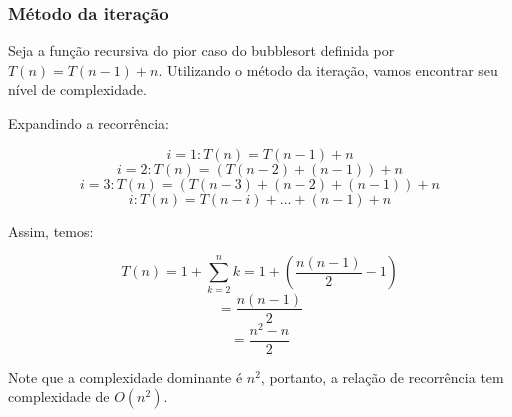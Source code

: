 \subsubsection{Método da iteração}
Seja a função recursiva do pior caso do bubblesort definida por \( T(n) = T(n-1) + n \). Utilizando o método da iteração, vamos encontrar seu nível de complexidade. 

Expandindo a recorrência:

\[
i = 1 : T(n) = T(n - 1) + n
\]
\[
i = 2 : T(n) = (T(n - 2) + (n - 1)) + n
\]
\[
i = 3 : T(n) = (T(n - 3) + (n - 2) + (n - 1)) + n
\]
\[
i : T(n) = T(n - i) + \dots + (n - 1) + n
\]

Assim, temos:

\[
T(n) = 1 + \sum_{k=2}^{n} k = 1 + \left( \frac{n(n-1)}{2} - 1 \right)
\]
\[
= \frac{n(n-1)}{2}
\]
\[
= \frac{n^2 - n}{2}
\]

Note que a complexidade dominante é \( n^2 \), portanto, a relação de recorrência tem complexidade de \( O(n^2) \).

